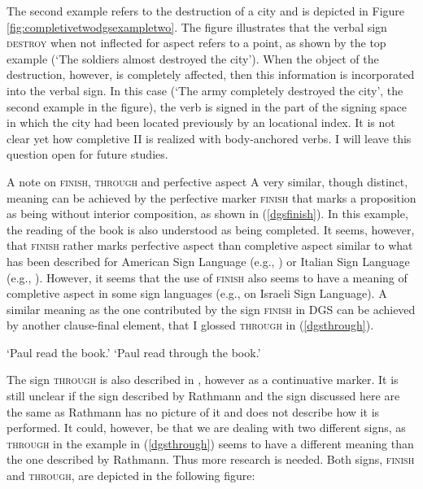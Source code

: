 The second example refers to the destruction of a city and is depicted in Figure \ref{fig:completivetwodgsexampletwo}. The figure illustrates that the verbal sign \textsc{destroy} when not inflected for aspect refers to a point, as shown by the top example (`The soldiers almost destroyed the city'). When the object of the destruction, however, is completely affected, then this information is incorporated into the verbal sign. In this case (`The army completely destroyed the city', the second example in the figure), the verb is signed in the part of the signing space in which the city had been located previously by an locational index. It is not clear yet how completive II is realized with body-anchored verbs. I will leave this question open for future studies.



\begin{digression}{{A note on \textsc{finish}, \textsc{through} and perfective aspect}}{}
\noindent A very similar, though distinct, meaning can be achieved by the perfective marker \textsc{finish} that marks a proposition as being without interior composition, as shown in (\ref{dgsfinish}). In this example, the reading of the book is also understood as being completed. It seems, however, that \textsc{finish} rather marks perfective aspect than completive aspect similar to what has been described for American Sign Language (e.g., \citealt{aarons1992clausal}) or Italian Sign Language (e.g., \citealt{zucchi2003}). However, it seems that the use of \textsc{finish} also seems to have a meaning of completive aspect in some sign languages (e.g., \citealt{meir1999aperfect} on Israeli Sign Language). A similar meaning as the one contributed by the sign \textsc{finish} in DGS can be achieved by another clause-final element, that I glossed \textsc{through} in (\ref{dgsthrough}).


\begin{exe}
\ex\label{ex:perfectivea}\begin{xlist}
\glt `Paul read the book.' \label{dgsfinish}
\glt `Paul read through the book.' \label{dgsthrough}
\end{xlist}
\end{exe}

\noindent The sign \textsc{through} is also described in \citet[259]{rathmann2005event}, however as a continuative marker. It is still unclear if the sign described by Rathmann and the sign discussed here are the same as Rathmann has no picture of it and does not describe how it is performed. It could, however, be that we are dealing with two different signs, as \textsc{through} in the example in (\ref{dgsthrough}) seems to have a different meaning than the one described by Rathmann. Thus more research is needed. Both signs, \textsc{finish} and \textsc{through}, are depicted in the following figure: \\


\end{digression}
